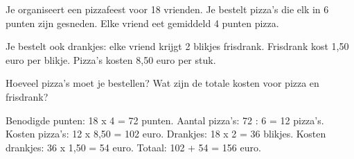 \begin{opgave}
Je organiseert een pizzafeest voor 18 vrienden. Je bestelt pizza's die elk in 6 punten zijn
gesneden. Elke vriend eet gemiddeld 4 punten pizza.

Je bestelt ook drankjes: elke vriend krijgt 2 blikjes frisdrank. Frisdrank kost 1,50 euro per
blikje. Pizza's kosten 8,50 euro per stuk.

Hoeveel pizza's moet je bestellen? Wat zijn de totale kosten voor pizza en frisdrank?
\end{opgave}

\begin{oplossing}
Benodigde punten: 18 x 4 = 72 punten.
Aantal pizza's: 72 : 6 = 12 pizza's.
Kosten pizza's: 12 x 8,50 = 102 euro.
Drankjes: 18 x 2 = 36 blikjes.
Kosten drankjes: 36 x 1,50 = 54 euro.
Totaal: 102 + 54 = 156 euro.
\end{oplossing}
